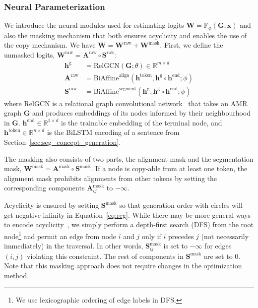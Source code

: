 \documentclass[11pt]{article}
\begin{document}
\subsubsection{Neural Parameterization} \label{sec:mask}
We introduce the neural modules used for estimating logits $ \mathbf{W} = \mathrm{F}_\phi(\mathbf{G},\mathbf{x}) $ and also the masking mechanism that both ensures acyclicity and enables the use of the  copy mechanism. We have $ \mathbf{W}=\mathbf{W}^{\mathrm{raw}} + \mathbf{W}^{\mathrm{mask}} $. First, we define the unmasked logits, $\mathbf{W}^{\mathrm{raw}}= \mathbf{A}^{\mathrm{raw}}\circ  \mathbf{S}^{\mathrm{raw}} $:
\begin{align}
    \nonumber
    \mathbf{h}^{\mathrm{g}} &= \mathrm{RelGCN}(\mathbf{G};\theta)  \in \mathbb{R}^{m \times d} \\
\nonumber
    \mathbf{A}^{\mathrm{raw}} &= \mathrm{BiAffine}^{\mathrm{align}}( \mathbf{h}^{\mathrm{token}}, \mathbf{h}^{\mathrm{g}}\circ \mathbf{h}^{\mathrm{end}} ;\phi) \\
    \nonumber
    \mathbf{S}^{\mathrm{raw}} &= \mathrm{BiAffine}^{\mathrm{segment}}(  \mathbf{h}^{\mathrm{g}}, \mathbf{h}^{\mathrm{g}}\circ \mathbf{h}^{\mathrm{end}}  ;
    \phi) 
\end{align}
where $\mathrm{RelGCN}$ is a relational graph convolutional network~\cite{Schlichtkrull2018ModelingRD} that takes  an AMR graph $\mathbf{G}$  and produces embeddings of its nodes informed by their neighbourhood in $\mathbf{G}$.  $\mathbf{h}^{\mathrm{end}} \in \mathbb{R}^{1 \times d}$ is the trainable embedding of the terminal node, and $\mathbf{h}^{\mathrm{token}}  \in \mathbb{R}^{n \times d} $ is the BiLSTM encoding of a sentence from Section~\ref{sec:seg_concept_generation}.



The masking also consists of two parts, the alignment mask and the segmentation mask,  $\mathbf{W}^{\mathrm{mask}}=\mathbf{A}^{\mathrm{mask}}\circ  \mathbf{S}^{\mathrm{mask}}  $.
If a node is copy-able from at least one token, the alignment mask prohibits alignments from other tokens by setting the corresponding components $\mathbf{A}^{\mathrm{mask}}_{ij}$ to $-\infty$. 

Acyclicity is ensured by setting $\mathbf{S}^{\mathrm{mask}}$ so that generation order with circles will get negative infinity in Equation~\ref{eq:reg}.
While there may be more general
ways to encode acyclicity~\cite{martins2009concise},
we simply perform a depth-first search (DFS) from the root node\footnote{We use
lexicographic ordering of edge labels in DFS.}
and permit an edge from node $i$ and $j$ only if $i$ precedes $j$ (not necessarily immediately) in the traversal. In other words,  
$\mathbf{S}^{\mathrm{mask}}_{ij}$ is set to $-\infty$ for edges $(i,j)$ violating this constraint.
The rest of components in $\mathbf{S}^{\mathrm{mask}}$ are set to 0. Note that this masking approach does not require changes in the optimization method.
\end{document}
